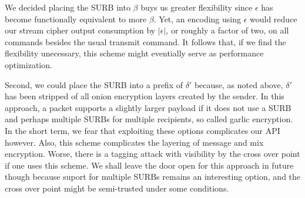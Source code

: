 We decided placing the SURB into $\beta$ buys us greater flexibility
since $\epsilon$ has become functionally equivalent to more $\beta$.  
Yet, an encoding using $\epsilon$ would reduce our stream cipher
output consumption by $|\epsilon|$, or roughly a factor of two,
on all commands besides the usual transmit command.  It follows that,
if we find the flexibility unecessary, this scheme might eventially
serve as performance optimization. 

Second, we could place the SURB into a prefix of $\delta'$ because,
as noted above, $\delta'$ has been stripped of all onion encryption
layers created by the sender.  In this approach, a packet supports
a slightly larger payload if it does not use a SURB and perhaps
multiple SURBs for multiple recipients, so called garlic encryption.
In the short term, we fear that exploiting these options complicates
our API however.  Also, this scheme complicates the layering of
message and mix encryption.  Worse, there is a tagging attack with
visibility by the cross over point if one uses this scheme.  We shall
leave the door open for this approach in future though because suport
for multiple SURBs remains an interesting option, and the cross over
point might be semi-trusted under some conditions.






